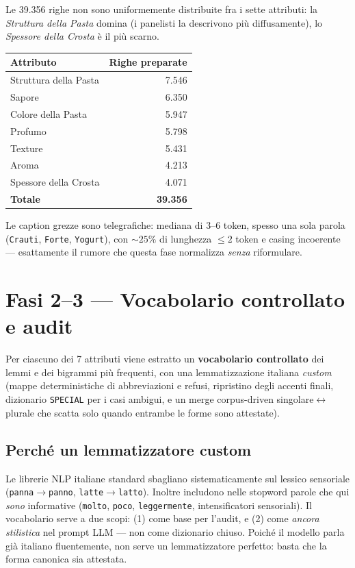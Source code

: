 \documentclass[11pt,a4paper]{article}
\begin{document}
Le 39.356 righe non sono uniformemente distribuite fra i sette attributi: la
\emph{Struttura della Pasta} domina (i panelisti la descrivono pi\`u
diffusamente), lo \emph{Spessore della Crosta} \`e il pi\`u scarno.

\begin{center}\small
\begin{tabular}{@{}lr@{}}
\toprule
\textbf{Attributo} & \textbf{Righe preparate} \\
\midrule
Struttura della Pasta & 7.546 \\
Sapore & 6.350 \\
Colore della Pasta & 5.947 \\
Profumo & 5.798 \\
Texture & 5.431 \\
Aroma & 4.213 \\
Spessore della Crosta & 4.071 \\
\midrule
\textbf{Totale} & \textbf{39.356} \\
\bottomrule
\end{tabular}
\end{center}

Le caption grezze sono telegrafiche: mediana di 3--6 token, spesso una sola
parola (\texttt{Crauti}, \texttt{Forte}, \texttt{Yogurt}), con $\sim 25\%$ di
lunghezza $\leq 2$ token e casing incoerente --- esattamente il rumore che
questa fase normalizza \emph{senza} riformulare.

\section{Fasi 2--3 --- Vocabolario controllato e audit}

Per ciascuno dei 7 attributi viene estratto un \textbf{vocabolario controllato}
dei lemmi e dei bigrammi pi\`u frequenti, con una lemmatizzazione italiana
\emph{custom} (mappe deterministiche di abbreviazioni e refusi, ripristino
degli accenti finali, dizionario \texttt{SPECIAL} per i casi ambigui, e un
merge corpus-driven singolare$\leftrightarrow$plurale che scatta solo quando
entrambe le forme sono attestate).

\subsection{Perch\'e un lemmatizzatore custom}
Le librerie NLP italiane standard sbagliano sistematicamente sul lessico
sensoriale (\texttt{panna}$\rightarrow$\texttt{panno},
\texttt{latte}$\rightarrow$\texttt{latto}). Inoltre includono nelle stopword
parole che qui \emph{sono} informative (\texttt{molto}, \texttt{poco},
\texttt{leggermente}, intensificatori sensoriali). Il vocabolario serve a due
scopi: (1) come base per l'audit, e (2) come \emph{ancora stilistica} nel
prompt LLM --- non come dizionario chiuso. Poich\'e il modello parla gi\`a
italiano fluentemente, non serve un lemmatizzatore perfetto: basta che la
forma canonica sia attestata.
\end{document}
